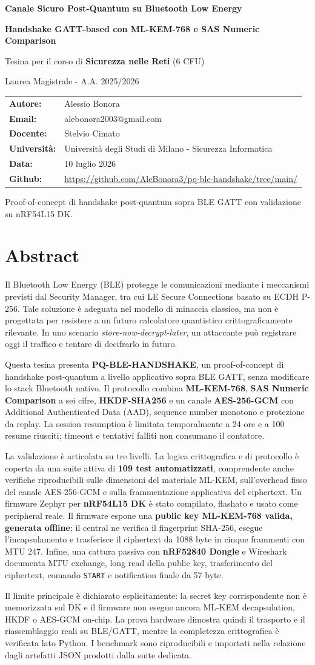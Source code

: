 \documentclass[11pt,a4paper]{article}
\makeatletter
\newcommand{\Course}{Sicurezza nelle Reti}
\newcommand{\Professor}{Stelvio Cimato}
\newcommand{\University}{Universit\`a degli Studi di Milano - Sicurezza Informatica}
\newcommand{\AcademicYear}{2025/2026}
\newcommand{\Student}{Alessio Bonora}
\newcommand{\StudentEmail}{alebonora2003@gmail.com}
\newcommand{\ProjectTitle}{Canale Sicuro Post-Quantum su Bluetooth Low Energy}
\newcommand{\ProjectSubtitle}{Handshake GATT-based con ML-KEM-768 e SAS Numeric Comparison}
\newcommand{\ProjectDate}{10 luglio 2026}
\newcommand{\ProjectRepo}{\url{https://github.com/AleBonora3/pq-ble-handshake/tree/main/}}
\newcommand{\makeprojecttitle}{%
\begin{titlepage}
  \centering
  \vspace*{1.5cm}
  {\Huge\bfseries\color{Primary}\ProjectTitle\par}
  \vspace{0.5cm}
  {\Large\bfseries\ProjectSubtitle\par}
  \vspace{1.4cm}
  {\large Tesina per il corso di \textbf{\Course} (6 CFU)\par}
  \vspace{0.2cm}
  {\large Laurea Magistrale - A.A. \AcademicYear\par}
  \vspace{1.2cm}
  \begin{tcolorbox}[width=0.82\textwidth,colback=SoftBg,colframe=Primary!45]
    \begin{tabularx}{\textwidth}{@{}lX@{}}
      \textbf{Autore:} & \Student \\
      \textbf{Email:} & \StudentEmail \\
      \textbf{Docente:} & \Professor \\
      \textbf{Universit\`a:} & \University \\
      \textbf{Data:} & \ProjectDate \\
      \textbf{Github:} & \ProjectRepo \\
    \end{tabularx}
  \end{tcolorbox}
  \vfill
  {\small Proof-of-concept di handshake post-quantum sopra BLE GATT con validazione su nRF54L15 DK.\par}
\end{titlepage}
}
\makeatother
\begin{document}
\makeprojecttitle
{}
\section*{Abstract}

Il Bluetooth Low Energy (BLE) protegge le comunicazioni mediante i
meccanismi previsti dal Security Manager, tra cui LE Secure Connections
basato su ECDH P-256. Tale soluzione è adeguata nel modello di minaccia
classico, ma non è progettata per resistere a un futuro calcolatore
quantistico crittograficamente rilevante. In uno scenario
\emph{store-now-decrypt-later}, un attaccante può registrare oggi il
traffico e tentare di decifrarlo in futuro.

Questa tesina presenta \textbf{PQ-BLE-HANDSHAKE}, un proof-of-concept di
handshake post-quantum a livello applicativo sopra BLE GATT, senza
modificare lo stack Bluetooth nativo. Il protocollo combina
\textbf{ML-KEM-768}, \textbf{SAS Numeric Comparison} a sei cifre,
\textbf{HKDF-SHA256} e un canale \textbf{AES-256-GCM} con Additional
Authenticated Data (AAD), sequence number monotono e protezione da replay.
La session resumption è limitata temporalmente a 24 ore e a 100 resume
riusciti; timeout e tentativi falliti non consumano il contatore.

La validazione è articolata su tre livelli. La logica crittografica e di
protocollo è coperta da una suite attiva di \textbf{109 test automatizzati}, comprendente anche verifiche
riproducibili sulle dimensioni del materiale ML-KEM, sull'overhead
fisso del canale AES-256-GCM e sulla frammentazione applicativa
del ciphertext.
Un firmware Zephyr per \textbf{nRF54L15 DK} è stato compilato, flashato e
usato come peripheral reale. Il firmware espone una \textbf{public key
ML-KEM-768 valida, generata offline}; il central ne verifica il fingerprint
SHA-256, esegue l'incapsulamento e trasferisce il ciphertext da 1088 byte in
cinque frammenti con MTU 247. Infine, una cattura passiva con
\textbf{nRF52840 Dongle} e Wireshark documenta MTU exchange, long read della
public key, trasferimento del ciphertext, comando \texttt{START} e
notification finale da 57 byte.

Il limite principale è dichiarato esplicitamente: la secret key
corrispondente non è memorizzata sul DK e il firmware non esegue ancora
ML-KEM decapsulation, HKDF o AES-GCM on-chip. La prova hardware dimostra
quindi il trasporto e il riassemblaggio reali su BLE/GATT, mentre la
completezza crittografica è verificata lato Python. I benchmark sono
riproducibili e importati nella relazione dagli artefatti JSON prodotti
dalla suite dedicata.
\end{document}
